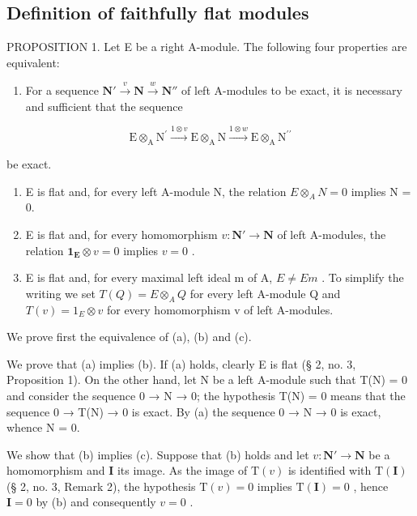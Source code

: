 \subsection{Definition of faithfully flat modules}

PROPOSITION 1. Let E be a right A-module. The following four properties are equivalent:

\begin{enumerate}
\def\labelenumi{(\alph{enumi})}
\tightlist
\item
  For a sequence \(\mathbf{N}' \xrightarrow{v} \mathbf{N} \xrightarrow{w} \mathbf{N}''\) of left A-modules to be exact, it is necessary and sufficient that the sequence
\end{enumerate}

\[
\mathrm{E} \otimes_ {\mathrm{A}} \mathrm{N} ^ {\prime} \xrightarrow {1 \otimes v} \mathrm{E} \otimes_ {\mathrm{A}} \mathrm{N} \xrightarrow {1 \otimes w} \mathrm{E} \otimes_ {\mathrm{A}} \mathrm{N} ^ {\prime \prime}
\]

be exact.

\begin{enumerate}
\def\labelenumi{(\alph{enumi})}
\setcounter{enumi}{1}
\item
  E is flat and, for every left A-module N, the relation \(E \otimes_{A} N = 0\) implies N = 0.
\item
  E is flat and, for every homomorphism \(v: \mathbf{N}' \to \mathbf{N}\) of left A-modules, the relation \(\mathbf{1}_{\mathbf{E}} \otimes v = 0\) implies \(v = 0\) .
\item
  E is flat and, for every maximal left ideal m of A, \(E \neq Em\) . To simplify the writing we set \(T(Q) = E \otimes_{A} Q\) for every left A-module Q and \(T(v) = 1_{E} \otimes v\) for every homomorphism v of left A-modules.
\end{enumerate}

We prove first the equivalence of (a), (b) and (c).

We prove that (a) implies (b). If (a) holds, clearly E is flat (§ 2, no. 3, Proposition 1). On the other hand, let N be a left A-module such that T(N) = 0 and consider the sequence 0 → N → 0; the hypothesis T(N) = 0 means that the sequence 0 → T(N) → 0 is exact. By (a) the sequence 0 → N → 0 is exact, whence N = 0.

We show that (b) implies (c). Suppose that (b) holds and let \(v: \mathbf{N}' \to \mathbf{N}\) be a homomorphism and \(\mathbf{I}\) its image. As the image of \(\mathrm{T}(v)\) is identified with \(\mathrm{T}(\mathbf{I})\) (§ 2, no. 3, Remark 2), the hypothesis \(\mathrm{T}(v) = 0\) implies \(\mathrm{T}(\mathbf{I}) = 0\) , hence \(\mathbf{I} = 0\) by (b) and consequently \(v = 0\) .


